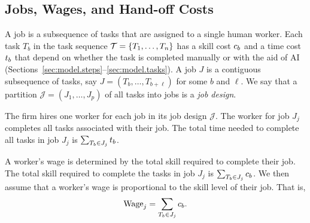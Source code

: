 \subsection{Jobs, Wages, and Hand-off Costs}
\label{sec:app.jobs}

A job is a subsequence of tasks that are assigned to a single human worker.
Each task $T_b$ in the task sequence $\mathcal{T} = \{T_1, \dotsc, T_n\}$ has a skill cost $c_{b}$ and a time cost $t_{b}$ that depend on whether the task is completed manually or with the aid of AI (Sections~\ref{sec:model.steps}--\ref{sec:model.tasks}).
A job $J$ is a contiguous subsequence of tasks, say $J = (T_b, \dotsc, T_{b+\ell})$ for some $b$ and $\ell$.
We say that a partition $\mathcal{J} = (J_1, \dotsc, J_p)$ of all tasks into jobs is a \emph{job design}.

The firm hires one worker for each job in its job design $\mathcal{J}$.
The worker for job $J_j$ completes all tasks associated with their job.
The total time needed to complete all tasks in job $J_j$ is $\sum_{T_b \in J_j} t_{b}$.

A worker's wage is determined by the total skill required to complete their job.
The total skill required to complete the tasks in job $J_j$ is $\sum_{T_b \in J_j} c_{b}$.
We then assume that a worker's wage is proportional to the skill level of their job.
That is,
\begin{align}
\label{eq:wage_jobdesign}
\text{Wage}_j = \sum_{T_b \in J_j} c_{b}.
\end{align}

